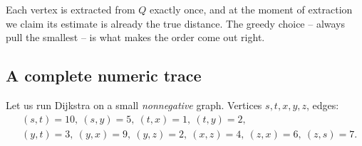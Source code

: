 Each vertex is extracted from $Q$ exactly once, and at the moment of extraction we
claim its estimate is already the true distance. The greedy choice -- always pull
the smallest -- is what makes the order come out right.

\subsection{A complete numeric trace}

Let us run Dijkstra on a small \emph{nonnegative} graph. Vertices $s,t,x,y,z$,
edges:
\[
\begin{aligned}
&(s,t)=10,\ (s,y)=5,\ (t,x)=1,\ (t,y)=2,\\
&(y,t)=3,\ (y,x)=9,\ (y,z)=2,\ (x,z)=4,\ (z,x)=6,\ (z,s)=7.
\end{aligned}
\]


